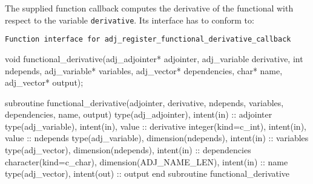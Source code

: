 The supplied function callback computes the derivative of the functional with respect to the variable \texttt{derivative}. 
Its interface has to conform to:

\begin{boxwithtitle}{\texttt{Function interface for \texttt{adj_register_functional_derivative_callback}}}
\begin{minipage}{\columnwidth}
\begin{ccode}
  void functional_derivative(adj_adjointer* adjointer,
                                 adj_variable derivative, int ndepends, 
                                 adj_variable* variables, adj_vector* dependencies,
                                 char* name, adj_vector* output);
\end{ccode}
\begin{fortrancode}
  subroutine functional_derivative(adjointer, derivative, ndepends, variables, 
                                   dependencies, name, output) 
    type(adj_adjointer), intent(in) :: adjointer
    type(adj_variable), intent(in), value :: derivative 
    integer(kind=c_int), intent(in), value :: ndepends
    type(adj_variable), dimension(ndepends), intent(in) :: variables
    type(adj_vector), dimension(ndepends), intent(in) :: dependencies
    character(kind=c_char), dimension(ADJ_NAME_LEN), intent(in) :: name
    type(adj_vector), intent(out) :: output
  end subroutine functional_derivative
\end{fortrancode}
\end{minipage}
\end{boxwithtitle}

